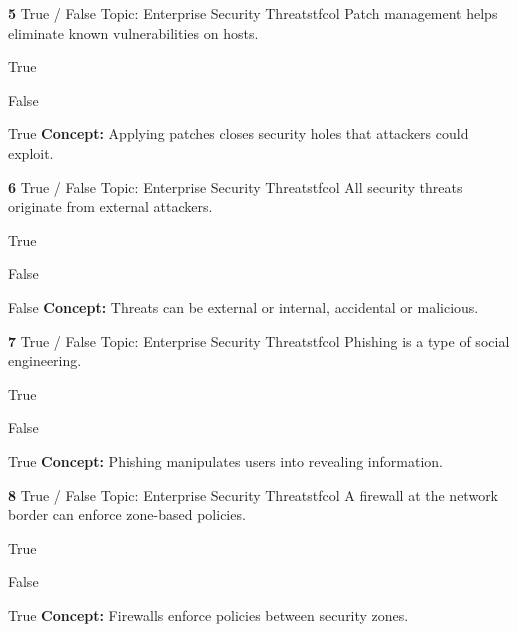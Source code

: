 \documentclass[10pt,a4paper]{article}
\begin{document}
\begin{qcard}{\color{white}\textbf{5} \hfill \small True / False \textbar{} Topic: Enterprise Security Threats}{tfcol}
Patch management helps eliminate known vulnerabilities on hosts.

\begin{qoptions}
\item True
\item False
\end{qoptions}
\begin{explainbox}{True}
\textbf{Concept:} Applying patches closes security holes that attackers could exploit.
\end{explainbox}
\end{qcard}

\begin{qcard}{\color{white}\textbf{6} \hfill \small True / False \textbar{} Topic: Enterprise Security Threats}{tfcol}
All security threats originate from external attackers.

\begin{qoptions}
\item True
\item False
\end{qoptions}
\begin{explainbox}{False}
\textbf{Concept:} Threats can be external or internal, accidental or malicious.
\end{explainbox}
\end{qcard}

\begin{qcard}{\color{white}\textbf{7} \hfill \small True / False \textbar{} Topic: Enterprise Security Threats}{tfcol}
Phishing is a type of social engineering.

\begin{qoptions}
\item True
\item False
\end{qoptions}
\begin{explainbox}{True}
\textbf{Concept:} Phishing manipulates users into revealing information.
\end{explainbox}
\end{qcard}

\begin{qcard}{\color{white}\textbf{8} \hfill \small True / False \textbar{} Topic: Enterprise Security Threats}{tfcol}
A firewall at the network border can enforce zone-based policies.

\begin{qoptions}
\item True
\item False
\end{qoptions}
\begin{explainbox}{True}
\textbf{Concept:} Firewalls enforce policies between security zones.
\end{explainbox}
\end{qcard}
\end{document}
